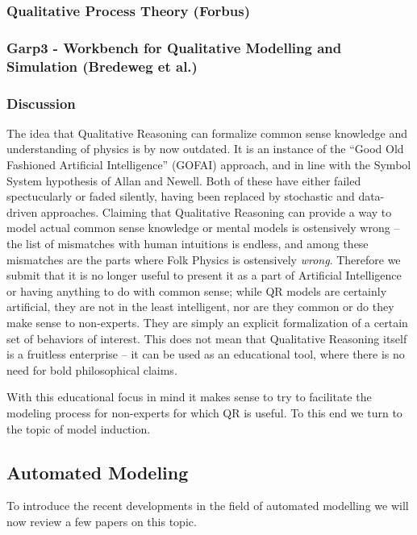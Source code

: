 \documentclass{article}
\begin{document}

\subsubsection{Qualitative Process Theory (Forbus)}

\subsubsection{Garp3 - Workbench for Qualitative Modelling and Simulation (Bredeweg et al.)}

\subsubsection{Discussion}

The idea that Qualitative Reasoning can formalize common sense knowledge and
understanding of physics is by now outdated. It is an instance of the ``Good
Old Fashioned Artificial Intelligence'' (GOFAI) approach, and in line with the
Symbol System hypothesis of Allan and Newell. %
Both of these have either failed spectucularly or faded silently, having been
replaced by stochastic and data-driven approaches.  Claiming that Qualitative
Reasoning can provide a way to model actual common sense knowledge or mental
models is ostensively wrong -- the list of mismatches with human intuitions is
endless, and among these mismatches are the parts where Folk Physics is
ostensively {\em wrong}. Therefore we submit that it is no longer useful to
present it as a part of Artificial Intelligence or having anything to do with
common sense; while QR models are certainly artificial, they are not in the
least intelligent, nor are they common or do they make sense to non-experts.
They are simply an explicit formalization of a certain set of behaviors of
interest. This does not mean that Qualitative Reasoning itself is a fruitless
enterprise -- it can be used as an educational tool, where there is no need for
bold philosophical claims.

With this educational focus in mind it makes sense to try to facilitate the
modeling process for non-experts for which QR is useful. To this end we turn to
the topic of model induction.

\subsection{Automated Modeling}

To introduce the recent developments in the field of automated modelling we
will now review a few papers on this topic.
\end{document}
